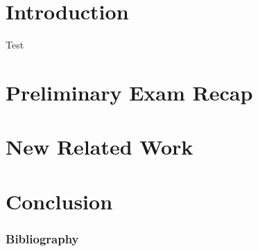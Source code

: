 \documentclass[aspectratio=169,xcolor=dvipsnames]{beamer}
\begin{document}
  \frame\titlepage

  \section{Introduction}
  \begin{frame}
    Test
  \end{frame}

  \section{Preliminary Exam Recap}

  \section{New Related Work}

  \section{}

  \section{}

  \section{Conclusion}

  \begin{frame}%
    \frametitle{Bibliography}
    \printbibliography[heading=none] %
  \end{frame}

  \appendix
\end{document}
